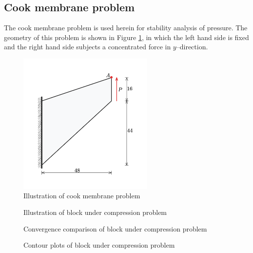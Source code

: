 \subsection{Cook membrane problem}

The cook membrane problem \cite{simo1990} is used herein for stability analysis of pressure. The geometry of this problem is shown in Figure \ref{fg:cook_illsutration},
in which the left hand side is fixed and the right hand side subjects a concentrated force in $y$--direction.
\begin{figure}[H]
\centering
\includegraphics[width=0.6\textwidth]{png/cook_membrane_model.png}
\caption{Illustration of cook membrane problem}\label{fg:cook_illsutration}
\end{figure}


\begin{figure}[!ht]
\centering
\caption{Illustration of block under compression problem}\label{block_illsutration}
\end{figure}

\begin{figure}[!ht]
\centering
\caption{Convergence comparison of block under compression problem}\label{block_convergence}
\end{figure}

\begin{figure}[!ht]
\centering
\caption{Contour plots of block under compression problem}\label{block_contour}
\end{figure}
